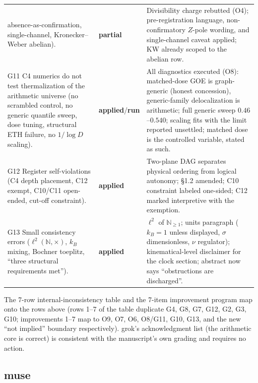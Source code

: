 \documentclass[11pt,a4paper]{article}
\newcommand{\ok}{\textbf{applied}}
\newcommand{\Nn}{\mathbb{N}}
\newcommand{\pver}{\textbf{partial}}
\begin{document}
\begin{longtable}{@{}p{}p{}p{}@{}}
absence-as-confirmation, single-channel, Kronecker--Weber abelian). & \pver &
Divisibility charge rebutted (O4); pre-registration language, non-confirmatory
$Z$-pole wording, and single-channel caveat applied; KW already scoped to the
abelian row.\\
G11 C4 numerics do not test thermalization of the arithmetic universe (no
scrambled control, no generic quantile sweep, dose tuning, structural ETH
failure, no $1/\log D$ scaling). & \ok/\textbf{run} & All diagnostics executed
(O8): matched-dose GOE is graph-generic (honest concession), generic-family
delocalization is arithmetic; full generic sweep $0.46$--$0.540$; scaling fits
with the limit reported unsettled; matched dose is the controlled variable,
stated as such.\\
G12 Register self-violations (C4 depth placement, C12 exempt, C10/C11
open-ended, cut-off constraint). & \ok & Two-plane DAG separates physical
ordering from logical autonomy; \S1.2 amended; C10 constraint labeled
one-sided; C12 marked interpretive with the exemption.\\
G13 Small consistency errors ($\ell^2(\Nn,\times)$, $k_B$ mixing, Bochner
toeplitz, ``three structural requirements met''). & \ok & $\ell^2$ of
$\Nn_{\geq1}$; units paragraph ($k_B=1$ unless displayed, $\sigma$
dimensionless, $\nu$ regulator); kinematical-level disclaimer for the
clock section; abstract now says ``obstructions are discharged''.\\
\bottomrule
\end{longtable}

The 7-row internal-inconsistency table and the 7-item improvement program map
onto the rows above (rows 1--7 of the table duplicate G4, G8, G7, G12, G2, G3,
G10; improvements 1--7 map to O9, O7, O6, O8/G11, G10, G13, and the new
``not implied'' boundary respectively). grok's acknowledgment list (the
arithmetic core is correct) is consistent with the manuscript's own
grading and requires no action.

\subsection{muse}
\end{document}
